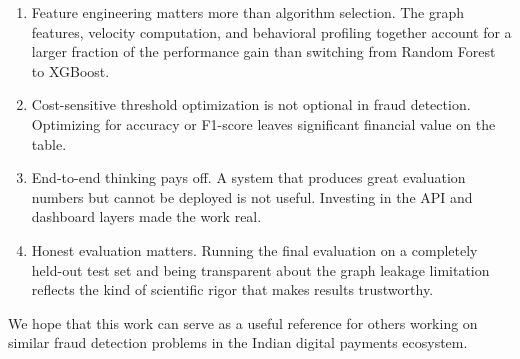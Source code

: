 \begin{enumerate}
    \item Feature engineering matters more than algorithm selection. The graph features, velocity computation, and behavioral profiling together account for a larger fraction of the performance gain than switching from Random Forest to XGBoost.
    
    \item Cost-sensitive threshold optimization is not optional in fraud detection. Optimizing for accuracy or F1-score leaves significant financial value on the table.
    
    \item End-to-end thinking pays off. A system that produces great evaluation numbers but cannot be deployed is not useful. Investing in the API and dashboard layers made the work real.
    
    \item Honest evaluation matters. Running the final evaluation on a completely held-out test set and being transparent about the graph leakage limitation reflects the kind of scientific rigor that makes results trustworthy.
\end{enumerate}

We hope that this work can serve as a useful reference for others working on similar fraud detection problems in the Indian digital payments ecosystem.
